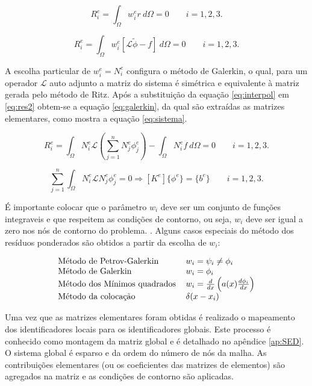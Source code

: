 \documentclass[
    12pt,               %
    openright,          %
    oneside,
    a4paper,            %
    english,            %
    french,             %
    spanish,            %
    brazil              %
    ]{abntex2}
\begin{document}
\begin{equation}
\label{eq:res1}
R_i^e = \int_{\Omega}{w_i^e r \ d\Omega} = 0 \qquad i = 1,2,3.
\end{equation}

\begin{equation}
\label{eq:res2}
R_i^e = \int_{\Omega}{w_i^e [\mathcal{L} \tilde{\phi} - f] \ d\Omega} = 0  \qquad i = 1,2,3.
\end{equation}  


A escolha particular de $w_i^e = N^e_i$ configura o método de Galerkin, o qual, para um operador $\mathcal{L}$ auto adjunto a matriz do sistema é simétrica e equivalente à matriz gerada pelo método de Ritz. Após a substituição da equação \ref{eq:interpol} em \ref{eq:res2} obtem-se a equação \ref{eq:galerkin}, da qual são extraídas as matrizes elementares, como mostra a equação \ref{eq:sistema}.


\begin{equation}
\label{eq:galerkin}
R_i^e = \int_{\Omega}{N_i^e \mathcal{L} \left( \sum_{j=1}^{n}{N_j^e \phi_j^e} \right) } - \int_{\Omega}{N^e_i f \ d \Omega} = 0  \qquad i = 1,2,3.
\end{equation} 


\begin{equation}
\label{eq:sistema}
\sum_{j=1}^{n}\int_{\Omega}{N_i^e \mathcal{L} N_j^e  \phi_j^e  } = 0 \Rightarrow [K^e]\{\phi^e\} = \{b^e\} \qquad i = 1,2,3.
\end{equation}  

É importante colocar que o parâmetro $w_i$ deve ser um conjunto de funções integraveis e que respeitem as condições de contorno, ou seja, $w_i$ deve ser igual a zero nos nós de contorno do problema.
\cite{reddy}. Alguns casos especiais do método dos resíduos ponderados são obtidos a partir da escolha de $w_i$:

\begin{equation}
\label{eq:metPond}
\begin{tabular}{ l l }
Método de Petrov-Galerkin & $ w_i = \psi_i \neq \phi_i $ \\ 
Método de Galerkin & $ w_i = \phi_i $\\  
Método dos Mínimos quadrados & $ w_i = \frac{d}{dx} \left(a(x)\frac{d \phi_i}{dx}\right) $ \\ 
Método da colocação & $ \delta(x - x_i)  $ 
\end{tabular}
\end{equation}

Uma vez que as matrizes elementares foram obtidas é realizado o mapeamento dos identificadores locais para os identificadores globais. Este processo é conhecido como montagem da matriz global e é detalhado no apêndice \ref{ap:SED}. O sistema global é esparso e da ordem do número de nós da malha. As contribuições elementares (ou os coeficientes das matrizes de elementos) são agregados na matriz e as condições de contorno são aplicadas.
\end{document}
